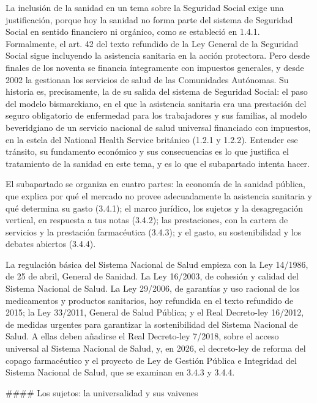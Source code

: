 \documentclass[10pt,a4paper]{article}
\begin{document}
La inclusión de la sanidad en un tema sobre la Seguridad Social exige una justificación, porque hoy la sanidad no forma parte del sistema de Seguridad Social en sentido financiero ni orgánico, como se estableció en 1.4.1. Formalmente, el art. 42 del texto refundido de la Ley General de la Seguridad Social sigue incluyendo la asistencia sanitaria en la acción protectora. Pero desde finales de los noventa se financia íntegramente con impuestos generales, y desde 2002 la gestionan los servicios de salud de las Comunidades Autónomas. Su historia es, precisamente, la de su salida del sistema de Seguridad Social: el paso del modelo bismarckiano, en el que la asistencia sanitaria era una prestación del seguro obligatorio de enfermedad para los trabajadores y sus familias, al modelo beveridgiano de un servicio nacional de salud universal financiado con impuestos, en la estela del National Health Service británico (1.2.1 y 1.2.2). Entender ese tránsito, su fundamento económico y sus consecuencias es lo que justifica el tratamiento de la sanidad en este tema, y es lo que el subapartado intenta hacer.

El subapartado se organiza en cuatro partes: la economía de la sanidad pública, que explica por qué el mercado no provee adecuadamente la asistencia sanitaria y qué determina su gasto (3.4.1); el marco jurídico, los sujetos y la desagregación vertical, en respuesta a tus notas (3.4.2); las prestaciones, con la cartera de servicios y la prestación farmacéutica (3.4.3); y el gasto, su sostenibilidad y los debates abiertos (3.4.4).

La regulación básica del Sistema Nacional de Salud empieza con la Ley 14/1986, de 25 de abril, General de Sanidad. La Ley 16/2003, de cohesión y calidad del Sistema Nacional de Salud. La Ley 29/2006, de garantías y uso racional de los medicamentos y productos sanitarios, hoy refundida en el texto refundido de 2015; la Ley 33/2011, General de Salud Pública; y el Real Decreto-ley 16/2012, de medidas urgentes para garantizar la sostenibilidad del Sistema Nacional de Salud. A ellas deben añadirse el Real Decreto-ley 7/2018, sobre el acceso universal al Sistema Nacional de Salud, y, en 2026, el decreto-ley de reforma del copago farmacéutico y el proyecto de Ley de Gestión Pública e Integridad del Sistema Nacional de Salud, que se examinan en 3.4.3 y 3.4.4.

#### Los sujetos: la universalidad y sus vaivenes
\end{document}
